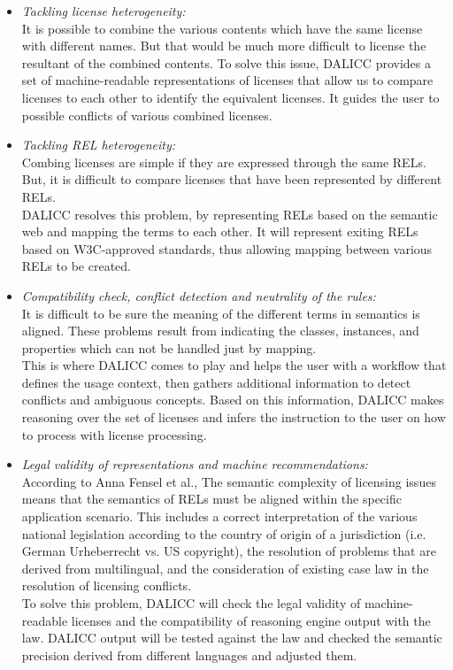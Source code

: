 \begin{itemize}
	\item \textit{Tackling license heterogeneity:} \\
	It is possible to combine the various contents which have the same license with different names. But that would be much more difficult to license the resultant of the combined contents. To solve this issue, DALICC provides a set of machine-readable representations of licenses that allow us to compare licenses to each other to identify the equivalent licenses. It guides the user to possible conflicts of various combined licenses.
	\item \textit{Tackling REL heterogeneity:} \\
	Combing licenses are simple if they are expressed through the same RELs. But, it is difficult to compare licenses that have been represented by different RELs.\\
	DALICC resolves this problem, by representing RELs based on the semantic web and mapping the terms to each other. It will represent exiting RELs based on W3C-approved standards, thus allowing mapping between various RELs to be created.
	\item \textit{Compatibility check, conflict detection and neutrality of the rules:} \\
	It is difficult to be sure the meaning of the different terms in semantics is aligned. These problems result from indicating the classes, instances, and properties which can not be handled just by mapping.\\
	This is where DALICC comes to play and helps the user with a workflow that defines the usage context, then gathers additional information to detect conflicts and ambiguous concepts. Based on this information, DALICC makes reasoning over the set of licenses and infers the instruction to the user on how to process with license processing.\\
	\item \textit{Legal validity of representations and machine recommendations:} \\
	According to Anna Fensel et al.\cite{Anna}, The semantic complexity of licensing issues means that the semantics of RELs must be aligned within the specific application scenario. This includes a correct interpretation of the various national legislation according to the country of origin of a jurisdiction (i.e. German Urheberrecht vs. US copyright), the resolution of problems that are derived from multilingual, and the consideration of existing case law in the resolution of licensing conflicts.\cite{Anna}\\
	To solve this problem, DALICC will check the legal validity of machine-readable licenses and the compatibility of reasoning engine output with the law. DALICC output will be tested against the law and checked the semantic precision derived from different languages and adjusted them\cite{Anna}.
	
\end{itemize}
